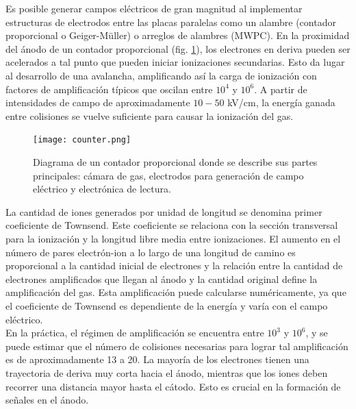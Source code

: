 \documentclass[]{book}
\begin{document}
\noindent Es posible generar campos eléctricos de gran magnitud al implementar estructuras de electrodos entre las placas paralelas como un alambre (contador proporcional o Geiger-Müller) o arreglos de alambres (MWPC). En la proximidad del ánodo de un contador proporcional (fig. \ref{fig:counter}), los electrones en deriva pueden ser acelerados a tal punto que pueden iniciar ionizaciones secundarias. Esto da lugar al desarrollo de una avalancha, amplificando así la carga de ionización con factores de amplificación típicos que oscilan entre \(10^4\) y \(10^6\). A partir de intensidades de campo de aproximadamente \(10-50\) kV/cm, la energía ganada entre colisiones se vuelve suficiente para causar la ionización del gas.\\

\begin{figure}[H]
    \centering
    \texttt{[image: counter.png]}
    \caption{Diagrama de un contador proporcional donde se describe sus partes principales: cámara de gas, electrodos para generación de campo eléctrico y electrónica de lectura.}
    \label{fig:counter}
\end{figure}

\noindent La cantidad de iones generados por unidad de longitud se denomina primer coeficiente de Townsend. Este coeficiente se relaciona con la sección transversal para la ionización y la longitud libre media entre ionizaciones. El aumento en el número de pares electrón-ion a lo largo de una longitud de camino es proporcional a la cantidad inicial de electrones y la relación entre la cantidad de electrones amplificados que llegan al ánodo y la cantidad original define la amplificación del gas. Esta amplificación puede calcularse numéricamente, ya que el coeficiente de Townsend es dependiente de la energía y varía con el campo eléctrico.\\

\noindent En la práctica, el régimen de amplificación se encuentra entre \(10^3\) y \(10^6\), y se puede estimar que el número de colisiones necesarias para lograr tal amplificación es de aproximadamente 13 a 20. La mayoría de los electrones tienen una trayectoria de deriva muy corta hacia el ánodo, mientras que los iones deben recorrer una distancia mayor hasta el cátodo. Esto es crucial en la formación de señales en el ánodo.\\
\end{document}
